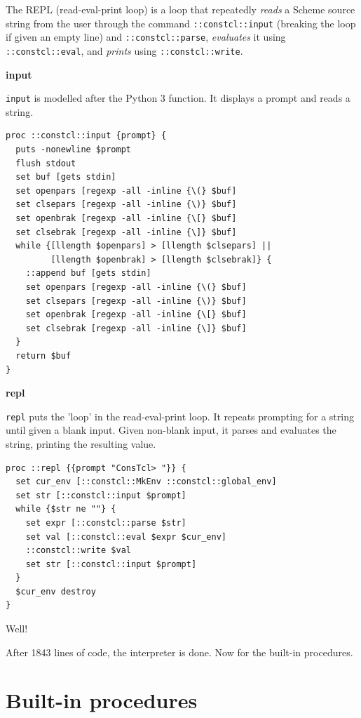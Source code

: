 \documentclass[twoside,9pt]{report}
\begin{document}
The REPL (read-eval-print loop) is a loop that repeatedly \emph{reads} a Scheme source string from the user through the command \texttt{::constcl::input} (breaking the loop if given an empty line) and \texttt{::constcl::parse}, \emph{evaluates} it using \texttt{::constcl::eval}, and \emph{prints} using \texttt{::constcl::write}.



\textbf{input}


\texttt{input} is modelled after the Python 3 function. It displays a prompt and reads a string.

\begin{lstlisting}
proc ::constcl::input {prompt} {
  puts -nonewline $prompt
  flush stdout
  set buf [gets stdin]
  set openpars [regexp -all -inline {\(} $buf]
  set clsepars [regexp -all -inline {\)} $buf]
  set openbrak [regexp -all -inline {\[} $buf]
  set clsebrak [regexp -all -inline {\]} $buf]
  while {[llength $openpars] > [llength $clsepars] ||
         [llength $openbrak] > [llength $clsebrak]} {
    ::append buf [gets stdin]
    set openpars [regexp -all -inline {\(} $buf]
    set clsepars [regexp -all -inline {\)} $buf]
    set openbrak [regexp -all -inline {\[} $buf]
    set clsebrak [regexp -all -inline {\]} $buf]
  }
  return $buf
}
\end{lstlisting}


\textbf{repl}


\texttt{repl} puts the 'loop' in the read-eval-print loop. It repeats prompting for a string until given a blank input. Given non-blank input, it parses and evaluates the string, printing the resulting value.

\begin{lstlisting}
proc ::repl {{prompt "ConsTcl> "}} {
  set cur_env [::constcl::MkEnv ::constcl::global_env]
  set str [::constcl::input $prompt]
  while {$str ne ""} {
    set expr [::constcl::parse $str]
    set val [::constcl::eval $expr $cur_env]
    ::constcl::write $val
    set str [::constcl::input $prompt]
  }
  $cur_env destroy
}
\end{lstlisting}


Well!


After 1843 lines of code, the interpreter is done. Now for the built-in procedures.

\chapter{Built-in procedures}
\label{built-in-procedures}
\end{document}
